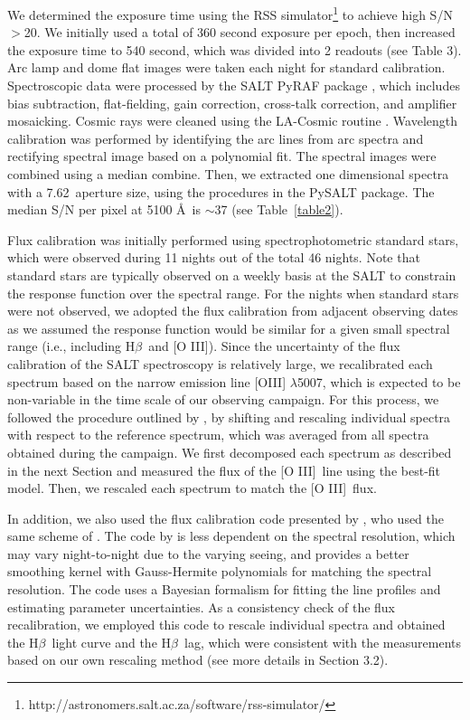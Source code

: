 \documentclass[iop]{emulateapj}
\newcommand{\Hb}{\rm H{$\beta$}}
\newcommand{\OIII}{[O {\small III}]}
\newcommand{\lam}{$\lambda$}
\begin{document}
We determined the exposure time using the RSS simulator\footnote{http://astronomers.salt.ac.za/software/rss-simulator/} to achieve high S/N$>$20. We initially used a total of 360 second exposure per epoch, then increased the exposure time to 540 second, which was divided into 2 readouts
(see Table 3). Arc lamp and dome flat images were taken each night for standard calibration. 
Spectroscopic data were processed by the SALT PyRAF package \citep[PySALT;][]{Crawford2010}, which includes bias subtraction, flat-fielding, gain correction, cross-talk correction, and amplifier mosaicking. Cosmic rays were cleaned using the LA-Cosmic routine \citep{vanDokkum2001}. Wavelength calibration was performed by identifying the arc lines from arc spectra and rectifying spectral image based on a polynomial fit. 
The spectral images were combined using a median combine. 
Then, we extracted one dimensional spectra with a 7.62\arcsec\ aperture size, 
using the procedures in the PySALT package. The median S/N per pixel at 5100 \AA\ is $\sim$37 (see Table~\ref{table2}).

Flux calibration was initially performed using spectrophotometric standard stars, which were observed during 11 nights out of the total 46 nights. Note that standard stars are typically observed on a weekly basis at the SALT to constrain the response function over the
spectral range. For the nights when standard stars were not observed, we adopted the flux calibration from adjacent observing dates
as we assumed the response function would be similar for a given small spectral range (i.e., including \Hb\ and \OIII). 
Since the uncertainty of the flux calibration of the SALT spectroscopy is relatively large, we recalibrated each spectrum based on the narrow emission line [OIII] \lam5007, which is expected to be non-variable in the time scale of our observing campaign. 
For this process, we followed the procedure outlined by \citet{vanGroningenWanders1992}, by shifting and rescaling individual spectra with respect to the reference spectrum, which was averaged from all spectra obtained during the campaign. We first decomposed each spectrum as described in the next Section and measured the flux of the \OIII\ line using the best-fit model. Then, we rescaled each spectrum to match the \OIII\ flux. 

In addition, we also used the flux calibration code presented by \citet{Fausnaugh2016}, who used the same scheme of \citet{vanGroningenWanders1992}. The code by \citet{Fausnaugh2016} is less dependent on the spectral resolution, which may vary night-to-night due to the varying seeing, and provides a better smoothing kernel with Gauss-Hermite polynomials for matching the spectral resolution. The code uses a Bayesian formalism for fitting the line profiles and estimating parameter uncertainties. As a consistency check of the flux recalibration, we employed this code to rescale individual spectra and obtained the \Hb\ light curve and the \Hb\ lag, which were consistent with the measurements based on our own rescaling method (see more details in Section 3.2).
\end{document}
